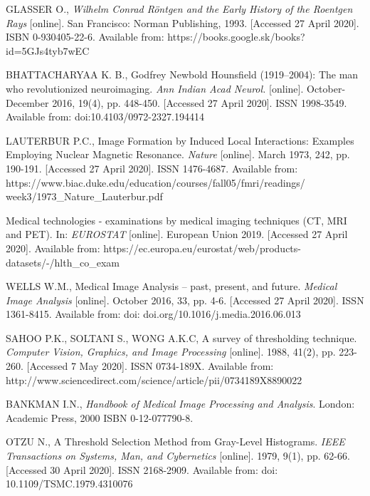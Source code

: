 \begin{thebibliography}{9}

GLASSER O., \textit{Wilhelm Conrad Röntgen and the Early History of the Roentgen Rays} [online]. San Francisco: Norman Publishing, 1993. [Accessed 27 April 2020]. ISBN 0-930405-22-6. Available from: https://books.google.sk/books?id=5GJs4tyb7wEC

BHATTACHARYAA K. B., Godfrey Newbold Hounsfield (1919–2004): The man who revolutionized neuroimaging. \textit{Ann Indian Acad Neurol.} [online]. October-December 2016, 19(4), pp. 448-450. [Accessed 27 April 2020]. ISSN 1998-3549. Available from: doi:10.4103/0972-2327.194414

LAUTERBUR P.C., Image Formation by Induced Local Interactions: Examples Employing Nuclear Magnetic Resonance. \textit{Nature} [online]. March 1973, 242, pp. 190-191. [Accessed 27 April 2020]. ISSN 1476-4687. Available from: https://www.biac.duke.edu/education/courses/fall05/fmri/readings/
week3/1973\_Nature\_Lauterbur.pdf

Medical technologies - examinations by medical imaging techniques (CT, MRI and PET). In: \textit{EUROSTAT} [online]. European Union 2019. [Accessed 27 April 2020]. Available from: https://ec.europa.eu/eurostat/web/products-datasets/-/hlth\_co\_exam

WELLS W.M., Medical Image Analysis – past, present, and future. \textit{Medical Image Analysis} [online]. October 2016, 33, pp. 4-6. [Accessed 27 April 2020]. ISSN 1361-8415. Available from: doi: doi.org/10.1016/j.media.2016.06.013

SAHOO P.K., SOLTANI S., WONG A.K.C, A survey of thresholding technique. \textit{Computer Vision, Graphics, and Image Processing} [online]. 1988, 41(2), pp. 223-260. [Accessed 7 May 2020]. ISSN 0734-189X. Available from: http://www.sciencedirect.com/science/article/pii/0734189X8890022

BANKMAN I.N., \textit{Handbook of Medical Image Processing and Analysis}. London: Academic Press, 2000 ISBN 0-12-077790-8. 

OTZU N., A Threshold Selection Method from Gray-Level Histograms. \textit{IEEE Transactions on Systems, Man, and Cybernetics} [online]. 1979, 9(1), pp. 62-66. [Accessed 30 April 2020]. ISSN 2168-2909. Available from: doi: 10.1109/TSMC.1979.4310076


\end{thebibliography}
